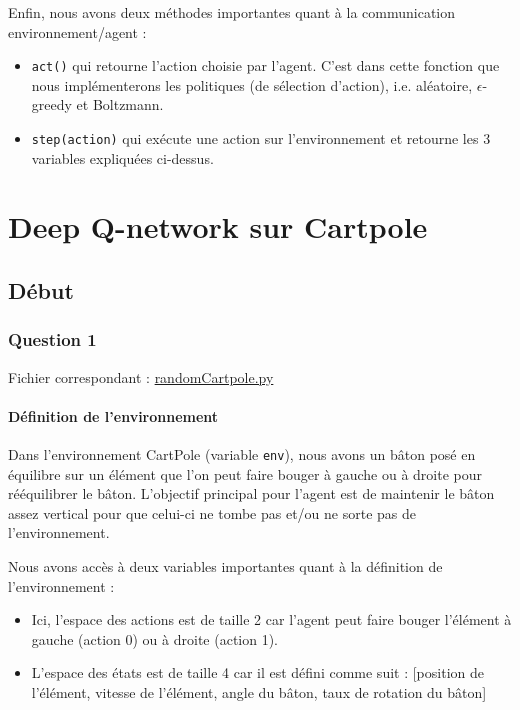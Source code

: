 \documentclass[10pt,a4paper]{article}
\begin{document}
Enfin, nous avons deux méthodes importantes quant à la communication environnement/agent :
\begin{itemize}
	\item \lstinline{act()} qui retourne l'action choisie par l'agent. C'est dans cette fonction que nous implémenterons les politiques (de sélection d'action), i.e. aléatoire, $\epsilon$-greedy et Boltzmann. 
	\item \lstinline{step(action)} qui exécute une action sur l'environnement et retourne les 3 variables expliquées ci-dessus. 
\end{itemize}

\section{Deep Q-network sur Cartpole}

\subsection{Début}

\subsubsection{Question 1}

Fichier correspondant : \href{https://github.com/NellyBarret/IA5-TP-APR/blob/master/randomCartPole.py}{randomCartpole.py}

\paragraph{Définition de l'environnement}

Dans l'environnement CartPole (variable \lstinline{env}), nous avons un bâton posé en équilibre sur un élément que l'on peut faire bouger à gauche ou à droite pour rééquilibrer le bâton. L'objectif principal pour l'agent est de maintenir le bâton assez vertical pour que celui-ci ne tombe pas et/ou ne sorte pas de l'environnement.

Nous avons accès à deux variables importantes quant à la définition de l'environnement :
\begin{itemize}
	\item Ici, l'espace des actions est de taille 2 car l'agent peut faire bouger l'élément à gauche (action 0) ou à droite (action 1).
	\item L'espace des états est de taille 4 car il est défini comme suit : [position de l'élément, vitesse de l'élément, angle du bâton, taux de rotation du bâton]
\end{itemize}
\end{document}
